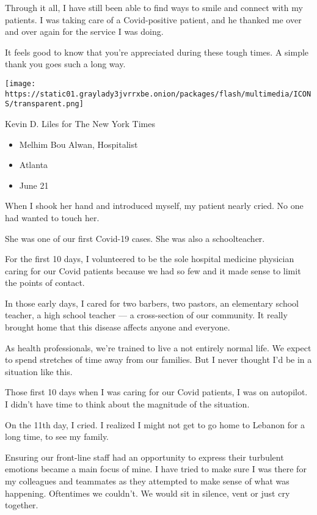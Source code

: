 Through it all, I have still been able to find ways to smile and connect
with my patients. I was taking care of a Covid-positive patient, and he
thanked me over and over again for the service I was doing.

It feels good to know that you're appreciated during these tough times.
A simple thank you goes such a long way.

\texttt{[image: https://static01.graylady3jvrrxbe.onion/packages/flash/multimedia/ICONS/transparent.png]}

Kevin D. Liles for The New York Times

\begin{itemize}
\tightlist
\item
  Melhim Bou Alwan, Hospitalist
\item
  Atlanta
\item
  June 21
\end{itemize}

When I shook her hand and introduced myself, my patient nearly cried. No
one had wanted to touch her.

She was one of our first Covid-19 cases. She was also a schoolteacher.

For the first 10 days, I volunteered to be the sole hospital medicine
physician caring for our Covid patients because we had so few and it
made sense to limit the points of contact.

In those early days, I cared for two barbers, two pastors, an elementary
school teacher, a high school teacher --- a cross-section of our
community. It really brought home that this disease affects anyone and
everyone.

As health professionals, we're trained to live a not entirely normal
life. We expect to spend stretches of time away from our families. But I
never thought I'd be in a situation like this.

Those first 10 days when I was caring for our Covid patients, I was on
autopilot. I didn't have time to think about the magnitude of the
situation.

On the 11th day, I cried. I realized I might not get to go home to
Lebanon for a long time, to see my family.

Ensuring our front-line staff had an opportunity to express their
turbulent emotions became a main focus of mine. I have tried to make
sure I was there for my colleagues and teammates as they attempted to
make sense of what was happening. Oftentimes we couldn't. We would sit
in silence, vent or just cry together.

